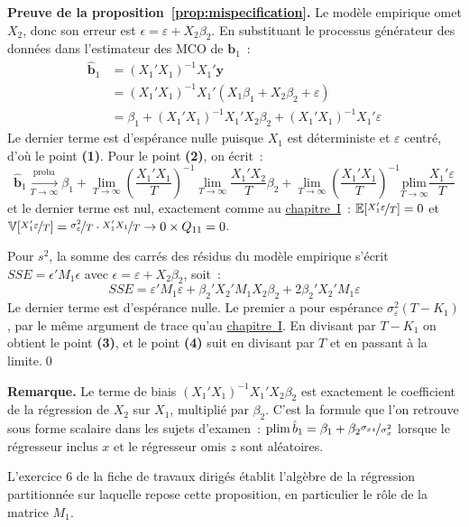 \documentclass[10pt,a4paper]{article}
\newcommand{\siteurl}{https://le-mans.adjemian.eu/econometrics}
\newcommand{\chapref}[2]{\href{\siteurl/chapitre-#1.pdf}{chapitre~#2}}
\newcommand{\plim}{\xrightarrow[T\rightarrow\infty]{\text{proba}}}
\theoremstyle{definition}
\renewcommand{\newline}{\unskip\par\vspace{1.5pt}}
\begin{document}
\begin{notes}

  \textbf{Preuve de la proposition~\ref{prop:mispecification}.} Le modèle empirique
  omet $X_2$, donc son erreur est $\epsilon = \varepsilon + X_2\beta_2$. En substituant
  le processus générateur des données dans l'estimateur des MCO de $\mathbf b_1$~:
  \[
    \begin{split}
      \hat{\mathbf b}_1 &= (X_1'X_1)^{-1}X_1'\mathbf y\\
                        &= (X_1'X_1)^{-1}X_1'\left( X_1\beta_1 + X_2\beta_2 + \varepsilon \right)\\
                        &= \beta_1 + (X_1'X_1)^{-1}X_1'X_2\beta_2 + (X_1'X_1)^{-1}X_1'\varepsilon
    \end{split}
  \]
  Le dernier terme est d'espérance nulle puisque $X_1$ est déterministe et
  $\varepsilon$ centré, d'où le point \textbf{(1)}. Pour le point \textbf{(2)}, on
  écrit~:
  \[
    \hat{\mathbf b}_1 \plim \beta_1
      + \underset{T\to\infty}{\lim}\left(\frac{X_1'X_1}{T}\right)^{-1}
        \underset{T\to\infty}{\lim}\frac{X_1'X_2}{T}\beta_2
      + \underset{T\to\infty}{\lim}\left(\frac{X_1'X_1}{T}\right)^{-1}
        \underset{T\to\infty}{\text{plim}}\frac{X_1'\varepsilon}{T}
  \]
  et le dernier terme est nul, exactement comme au \chapref{1}{I}~:
  $\mathbb E[\nicefrac{X_1'\varepsilon}{T}]=0$ et
  $\mathbb V[\nicefrac{X_1'\varepsilon}{T}] = \nicefrac{\sigma_{\varepsilon}^2}{T}\cdot\nicefrac{X_1'X_1}{T}
  \rightarrow 0\times Q_{11} = 0$.\newline

  Pour $s^2$, la somme des carrés des résidus du modèle empirique s'écrit
  $SSE = \epsilon'M_1\epsilon$ avec $\epsilon = \varepsilon + X_2\beta_2$, soit~:
  \[
    SSE = \varepsilon'M_1\varepsilon
        + \beta_2'X_2'M_1X_2\beta_2
        + 2\beta_2'X_2'M_1\varepsilon
  \]
  Le dernier terme est d'espérance nulle. Le premier a pour espérance
  $\sigma_{\varepsilon}^2(T-K_1)$, par le même argument de trace qu'au
  \chapref{1}{I}. En divisant par $T-K_1$ on obtient le point \textbf{(3)}, et le
  point \textbf{(4)} suit en divisant par $T$ et en passant à la limite.\qed

  \bigskip

  \textbf{Remarque.} Le terme de biais $(X_1'X_1)^{-1}X_1'X_2\beta_2$ est exactement
  le coefficient de la régression de $X_2$ sur $X_1$, multiplié par $\beta_2$. C'est
  la formule que l'on retrouve sous forme scalaire dans les sujets d'examen~:
  $\text{plim}\,\hat b_1 = \beta_1 + \beta_2\nicefrac{\sigma_{xz}}{\sigma_x^2}$ lorsque
  le régresseur inclus $x$ et le régresseur omis $z$ sont aléatoires.\newline

  L'exercice 6 de la fiche de travaux dirigés établit l'algèbre de la régression
  partitionnée sur laquelle repose cette proposition, en particulier le rôle de la
  matrice $M_1$.

\end{notes}
\end{document}
